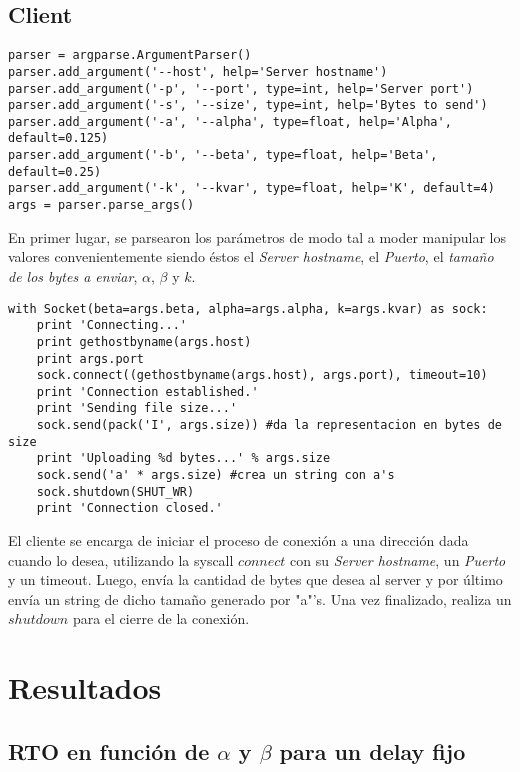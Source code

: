 \documentclass[10pt, a4paper]{article}
\begin{document}
\subsection{Client}
\begin{verbatim}
parser = argparse.ArgumentParser()
parser.add_argument('--host', help='Server hostname')
parser.add_argument('-p', '--port', type=int, help='Server port')
parser.add_argument('-s', '--size', type=int, help='Bytes to send')
parser.add_argument('-a', '--alpha', type=float, help='Alpha', default=0.125)
parser.add_argument('-b', '--beta', type=float, help='Beta', default=0.25)
parser.add_argument('-k', '--kvar', type=float, help='K', default=4)
args = parser.parse_args()
\end{verbatim}

En primer lugar, se parsearon los parámetros de modo tal a moder manipular los valores convenientemente siendo éstos el \textit{Server hostname}, el \textit{Puerto}, el \textit{tamaño de los bytes a enviar}, $\alpha$, $\beta$ y $k$.

\begin{verbatim}
with Socket(beta=args.beta, alpha=args.alpha, k=args.kvar) as sock:
    print 'Connecting...'
    print gethostbyname(args.host)
    print args.port
    sock.connect((gethostbyname(args.host), args.port), timeout=10)
    print 'Connection established.'
    print 'Sending file size...'
    sock.send(pack('I', args.size)) #da la representacion en bytes de size
    print 'Uploading %d bytes...' % args.size
    sock.send('a' * args.size) #crea un string con a's
    sock.shutdown(SHUT_WR)
	print 'Connection closed.'
\end{verbatim}

El cliente se encarga de iniciar el proceso de conexión a una dirección dada cuando lo desea, utilizando la syscall $connect$ con su \textit{Server hostname}, un \textit{Puerto} y un timeout. Luego, envía la cantidad de bytes que desea al server y por último envía un string de dicho tamaño generado por "a"'s. Una vez finalizado, realiza un $shutdown$ para el cierre de la conexión.

\section{Resultados}
\subsection{RTO en función de $\alpha$ y $\beta$ para un delay fijo}
\end{document}
